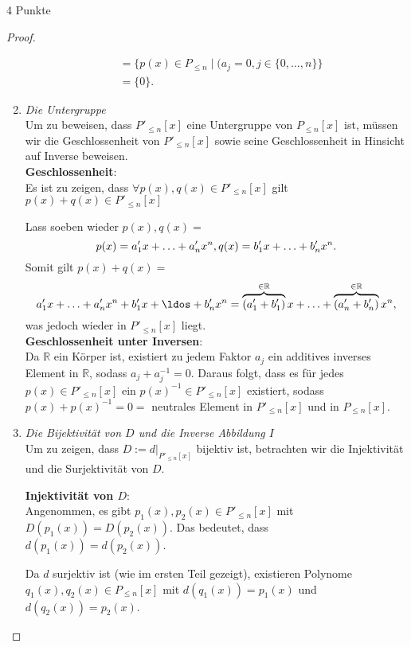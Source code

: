 \documentclass{problemset}
\begin{document}
\begin{problem}{4 Punkte}
\begin{proof}
\begin{enumerate}
\begin{align}
			                                 & = \{p(x) \in P_{\le n} \mid (a_j = 0, j \in \{0, \ldots, n\}\}                                                                    \\
			                                 & = \{0\}.
		      \end{align}
		      \checkmark
		\item \textit{Die Untergruppe} \\
		      Um zu beweisen, dass $P'_{\le n}[x]$ eine Untergruppe von $P_{\le n}[x]$ ist, müssen wir die Geschlossenheit von $P'_{\le n}[x]$ sowie seine Geschlossenheit in Hinsicht auf Inverse beweisen. \\
		      \textbf{Geschlossenheit}: \\
		      Es ist zu zeigen, dass $\forall p(x),q(x) \in P'_{\le n}[x]$ gilt $p(x) + q(x) \in P'_{\le n}[x]$

		      Lass soeben wieder $p(x), q(x) =$ \[
			      p(x) = a^\prime_1x + \ldots + a^\prime_nx^n, \\
			      q(x) = b^\prime_1x + \ldots + b^\prime_nx^n.
		      \]
		      Somit gilt $p(x) + q(x) =$ \[
			      a^\prime_1x + \ldots + a^\prime_nx^n + b^\prime_1x + \ldos + b^\prime_nx^n =
			      \overbrace{(a^\prime_1+b^\prime_1)}^{\in \mathbb{R}}x + \ldots + \overbrace{(a^\prime_n+b^\prime_n)}^{\in \mathbb{R}}x^n,
		      \] was jedoch wieder in $P'_{\le n}[x]$ liegt.
		      \checkmark
		      \\
		      \textbf{Geschlossenheit unter Inversen}: \\
		      Da $\mathbb{R}$ ein Körper ist, existiert zu jedem Faktor $a_j$ ein additives inverses Element in $\mathbb{R}$, sodass $a_j + a_j^{-1} = 0$.
		      Daraus folgt, dass es für jedes $p(x) \in P'_{\le n}[x]$ ein $p(x)^{-1} \in P'_{\le n}[x]$ existiert, sodass $p(x) + p(x)^{-1} = 0 =$ neutrales Element in $P'_{\le n}[x]$ und in $P_{\le n}[x]$.
		      \checkmark
		\item \textit{Die Bijektivität von $D$ und die Inverse Abbildung $I$} \\
		      Um zu zeigen, dass $D := d|_{P'_{\le n}[x]}$ bijektiv ist, betrachten wir die Injektivität und die Surjektivität von $D$.

		      \textbf{Injektivität von $D$}: \\
		      Angenommen, es gibt $p_1(x), p_2(x) \in P'_{\le n}[x]$ mit $D(p_1(x)) = D(p_2(x))$. Das bedeutet, dass $d(p_1(x)) = d(p_2(x))$.

		      Da $d$ surjektiv ist (wie im ersten Teil gezeigt), existieren Polynome $q_1(x), q_2(x) \in P_{\le n}[x]$ mit $d(q_1(x)) = p_1(x)$ und $d(q_2(x)) = p_2(x)$.


\end{enumerate}
\end{proof}
\end{problem}
\end{document}
